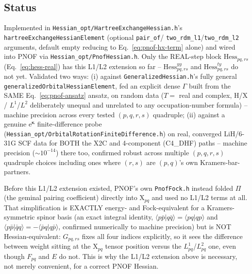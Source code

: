 \documentclass[11pt]{article}
\begin{document}
\subsection*{Status}

Implemented in \texttt{Hessian\_opt/HartreeExchangeHessian.h}'s
\texttt{hartreeExchangeHessianElement} (optional \texttt{pair\_of}/
\texttt{two\_rdm\_l1}/\texttt{two\_rdm\_l2} arguments, default empty
reducing to Eq.~\eqref{eq:pnof-hx-term} alone) and wired into PNOF via
\texttt{Hessian\_opt/PnofHessian.h}. Only the REAL-step block
$\text{Hess}_{pq,rs}$ (Eq.~\eqref{eq:hess-real}) has this L1/L2
extension so far -- $\text{Hess}^{yy}_{pq,rs}$ and
$\text{Hess}^{ty}_{pq,rs}$ do not yet. Validated two ways: (i) against
\texttt{GeneralizedHessian.h}'s fully general \texttt{generalizedOrbitalHessianElement},
fed an explicit dense $\Gamma$ built from the SAME Eq.~\eqref{eq:pnof-ansatz}
ansatz, on random data ($T=$ real and complex, $\mathrm{H}$/$\mathrm{X}$/
$L^1$/$L^2$ deliberately unequal and unrelated to any occupation-number
formula) -- machine precision across every tested $(p,q,r,s)$ quadruple;
(ii) against a genuine e$^{\boldsymbol\kappa}$ finite-difference probe
(\texttt{Hessian\_opt/OrbitalRotationFiniteDifference.h}) on real,
converged LiH/6-31G SCF data for BOTH the X2C and 4-component (C4\_DHF)
paths -- machine precision ($\sim 10^{-14}$) there too, confirmed
robust across multiple $(p,q,r,s)$ quadruple choices including ones
where $(r,s)$ are $(p,q)$'s own Kramers-bar-partners.

Before this L1/L2 extension existed, PNOF's own \texttt{PnofFock.h}
instead folded $\Pi$ (the geminal pairing coefficient) directly into
$\mathrm{X}_{pq}$ and used no L1/L2 terms at all. That simplification is
EXACTLY energy- and Fock-equivalent for a Kramers-symmetric spinor basis
(an exact integral identity, $\langle p\bar p|q\bar q\rangle=\langle
pq|qp\rangle$ and $\langle p\bar p|\bar q q\rangle=-\langle\bar p q|q\bar
p\rangle$, confirmed numerically to machine precision) but is NOT
Hessian-equivalent: $G_{pq,rs}$ fixes all four indices explicitly, so it
sees the difference between weight sitting at the $\mathrm{X}_{pq}$
tensor position versus the $L^{1}_{pq}$/$L^{2}_{pq}$ one, even though
$F_{pq}$ and $E$ do not. This is why the L1/L2 extension above is
necessary, not merely convenient, for a correct PNOF Hessian.
\end{document}
